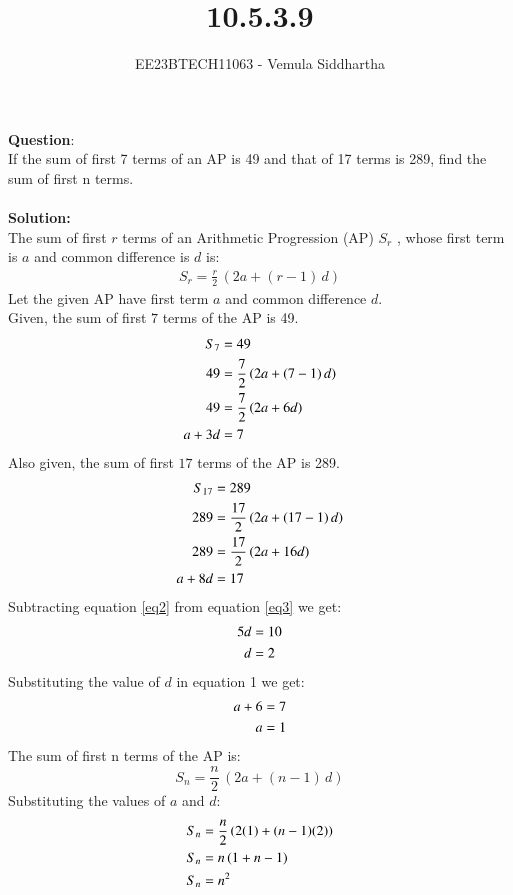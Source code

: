 \documentclass[journal,12pt,twocolumn]{IEEEtran}
\theoremstyle{remark}
\begin{document}

\vspace{3cm}

\title{10.5.3.9}
\author{EE23BTECH11063 - Vemula Siddhartha}
\maketitle
\newpage
\bigskip

\renewcommand{\thefigure}{\theenumi}
\renewcommand{\thetable}{\theenumi}
\textbf{Question}:\\
If the sum of first 7 terms of an AP is 49 and that of 17 terms is 289, find the sum of
first n terms.
\\\\
\textbf{Solution: }\\
The sum of first $r$ terms of an Arithmetic Progression (AP) $S_r$ , whose first term is $a$ and common difference is $d$ is:
\begin{align}
S_r=\frac{r}{2}\,(2a+(r-1)\,d)\label{eq1}
\end{align}
Let the given AP have first term $a$ and common difference $d$.\\
Given, the sum of first $7$ terms of the AP is 49.
\begin{align}
S_7&=49\notag\\
49&=\frac{7}{2}\,(2a+(7-1)\,d)\notag\\
49&=\frac{7}{2}\,(2a+6d)\notag\\
a+3d&=7\label{eq2}
\end{align}
Also given, the sum of first $17$ terms of the AP is 289.
\begin{align}
S_{17}&=289\notag\\
289&=\frac{17}{2}\,(2a+(17-1)\,d)\notag\\
289&=\frac{17}{2}\,(2a+16d)\notag\\
a+8d&=17\label{eq3}
\end{align}
Subtracting equation \ref{eq2} from equation \ref{eq3} we get:
\begin{align}
5d&=10\notag\\
d&=2\label{eq4}
\end{align}
Substituting the value of $d$ in equation 1 we get:
\begin{align}
a+6&=7\notag\\
a&=1\label{eq5}
\end{align}
The sum of first n terms of the AP is:
\[S_n= \frac{n}{2}\,(2a+(n-1)\,d)\]
Substituting the values of $a$ and $d$:
\begin{align}
S_n&=\frac{n}{2}\,(2(1)+(n-1)(2))\notag\\
S_n&=n\,(1+n-1)\notag\\
S_n&=n^2\label{eq6}
\end{align}
\end{document}
